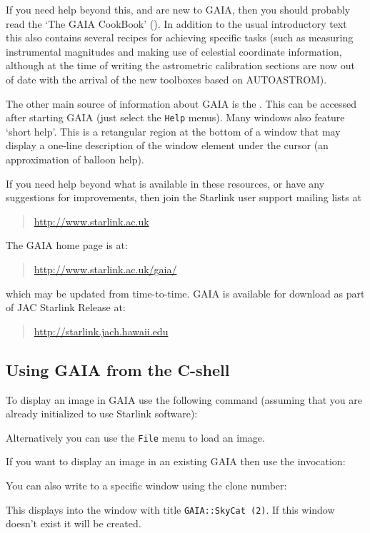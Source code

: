 \documentclass[twoside,11pt,nolof]{starlink}
\providecommand{\mytt}[1]{{\texttt{#1}}}
\begin{document}
If you need help beyond this, and are new to GAIA, then you should probably
read the `The GAIA CookBook' (). In addition to the usual
introductory text this also contains several recipes for achieving specific
tasks (such as measuring instrumental magnitudes and making use of celestial
coordinate information, although at the time of writing the astrometric
calibration sections are now out of date with the arrival of the new toolboxes
based on AUTOASTROM).

The other main source of information about GAIA is the
.
This can be accessed after starting GAIA (just select the
\mytt{Help} menus). Many windows also feature `short help'. This is a
retangular region at the bottom of a window that may display a
one-line description of the window element under the cursor (an
approximation of balloon help).

If you need help beyond what is available in these resources, or have
any suggestions for improvements, then join the Starlink user support
mailing lists at
\begin{quote}
\url{http://www.starlink.ac.uk}
\end{quote}
The GAIA home page is at:
\begin{quote}
\url{http://www.starlink.ac.uk/gaia/}
\end{quote}
which may be updated from time-to-time. GAIA is available for download
as part of JAC Starlink Release at:
\begin{quote}
\url{http://starlink.jach.hawaii.edu}
\end{quote}

\subsection{Using GAIA from the C-shell}

To display an image in GAIA use the following command
(assuming that you are already initialized to use Starlink software):
\begin{terminalv}
\end{terminalv}
Alternatively you can use the \mytt{File} menu to load an image.

If you want to display an image in an existing GAIA then use the
invocation:
\begin{terminalv}
\end{terminalv}
You can also write to a specific window using the clone number:
\begin{terminalv}
\end{terminalv}
This displays into the window with title \mytt{GAIA::SkyCat (2)}.
If this window doesn't exist it will be created.
\end{document}
